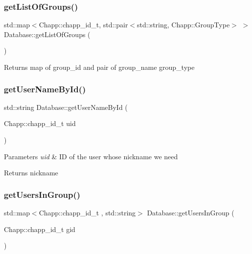 \subsubsection{\texorpdfstring{get\+List\+Of\+Groups()}{getListOfGroups()}}
{\footnotesize\ttfamily std\+::map$<$Chapp\+::chapp\+\_\+id\+\_\+t, std\+::pair$<$std\+::string, Chapp\+::\+Group\+Type$>$ $>$ Database\+::get\+List\+Of\+Groups (\begin{DoxyParamCaption}{ }\end{DoxyParamCaption})}

\begin{DoxyReturn}{Returns}
map of group\+\_\+id and pair of group\+\_\+name group\+\_\+type 
\end{DoxyReturn}
\mbox{\label{class_database_a11c428536c444314610396754abc07bb}} 
\subsubsection{\texorpdfstring{get\+User\+Name\+By\+Id()}{getUserNameById()}}
{\footnotesize\ttfamily std\+::string Database\+::get\+User\+Name\+By\+Id (\begin{DoxyParamCaption}\item[{Chapp\+::chapp\+\_\+id\+\_\+t}]{uid }\end{DoxyParamCaption})}


\begin{DoxyParams}{Parameters}
{\em uid} & ID of the user whose nickname we need \\
\hline
\end{DoxyParams}
\begin{DoxyReturn}{Returns}
nickname 
\end{DoxyReturn}
\mbox{\label{class_database_aa6ec358d0c6a35f9b5ee18f723d01f91}} 
\subsubsection{\texorpdfstring{get\+Users\+In\+Group()}{getUsersInGroup()}}
{\footnotesize\ttfamily std\+::map$<$Chapp\+::chapp\+\_\+id\+\_\+t , std\+::string$>$ Database\+::get\+Users\+In\+Group (\begin{DoxyParamCaption}\item[{Chapp\+::chapp\+\_\+id\+\_\+t}]{gid }\end{DoxyParamCaption})}

